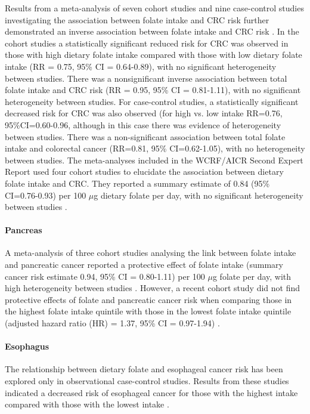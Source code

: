 \noindent Results from a meta-analysis of seven cohort studies and nine case-control studies investigating the association between folate intake and CRC risk further demonstrated an inverse association between folate intake and CRC risk \cite{c233}. In the cohort studies a statistically significant reduced risk for CRC was observed in those with high dietary folate intake compared with those with low dietary folate intake (RR = 0.75, 95\% CI = 0.64-0.89), with no significant heterogeneity between studies. There was a nonsignificant inverse association between total folate intake and CRC risk (RR = 0.95, 95\% CI = 0.81-1.11), with no significant heterogeneity between studies. For case-control studies, a statistically significant decreased risk for CRC was also observed (for high vs. low intake RR=0.76, 95\%CI=0.60-0.96, although in this case there was evidence of heterogeneity between studies. There was a non-significant association between total folate intake and colorectal cancer (RR=0.81, 95\% CI=0.62-1.05), with no heterogeneity between studies. The meta-analyses included in the WCRF/AICR Second Expert Report used four cohort studies to elucidate the association between dietary folate intake and CRC. They reported a summary estimate of 0.84 (95\% CI=0.76-0.93) per 100 $\mu$g dietary folate per day, with no significant heterogeneity between studies \cite{c214}. 
 
\paragraph{Pancreas} %
A meta-analysis of three cohort studies analysing the link between folate intake and pancreatic cancer reported a protective effect of folate intake (summary cancer risk estimate 0.94, 95\% CI = 0.80-1.11) per 100 $\mu$g folate per day, with high heterogeneity between studies \cite{c214}. However, a recent cohort study did not find protective effects of folate and pancreatic cancer risk when comparing those in the highest folate intake quintile with those in the lowest folate intake quintile (adjusted hazard ratio (HR) = 1.37, 95\% CI = 0.97-1.94) \cite{c234}. 
 
\paragraph{Esophagus} %
The relationship between dietary folate and esophageal cancer risk has been explored only in observational case-control studies. Results from these studies indicated a decreased risk of esophageal cancer for those with the highest intake compared with those with the lowest intake \cite{c214}. 
 
